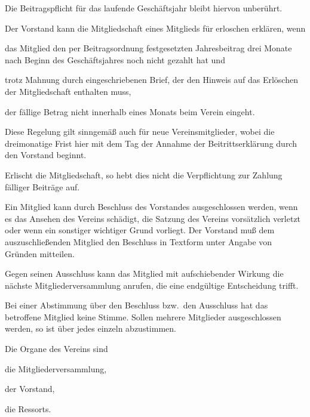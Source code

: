 \documentclass[draft]{scrartcl}
\begin{document}
\begin{contract}
Die Beitragspflicht für das laufende Geschäftsjahr bleibt hiervon unberührt.

Der Vorstand kann die Mitgliedschaft eines Mitglieds für erloschen erklären, wenn

\begin{compactitem}
  \item das Mitglied den per Beitragsordnung festgesetzten Jahresbeitrag
  drei Monate nach Beginn des Geschäftsjahres noch nicht gezahlt hat und
  \item trotz Mahnung durch eingeschriebenen Brief, der den Hinweis auf
  das Erlöschen der Mitgliedschaft enthalten muss,
  \item der fällige Betrag nicht innerhalb eines Monats beim Verein
  eingeht.
\end{compactitem}

Diese Regelung gilt sinngemäß auch für neue Vereinsmitglieder, wobei die
dreimonatige Frist hier mit dem Tag der Annahme der Beitrittserklärung
durch den Vorstand beginnt.

Erlischt die Mitgliedschaft, so hebt dies nicht die Verpflichtung zur Zahlung 
fälliger Beiträge auf.

\label{Ausschluss}

Ein Mitglied kann durch Beschluss des Vorstandes ausgeschlossen werden, wenn es
das Ansehen des Vereins schädigt, die Satzung des Vereins vorsätzlich
verletzt oder wenn ein sonstiger wichtiger Grund vorliegt. Der Vorstand muß
dem auszuschließenden Mitglied den Beschluss in Textform unter Angabe von Gründen
mitteilen.\label{Ausschluss}

Gegen seinen Ausschluss kann das Mitglied mit aufschiebender Wirkung die nächste
Mitgliederversammlung anrufen, die eine endgültige Entscheidung trifft.

Bei einer Abstimmung über den Beschluss bzw.\ den Ausschluss hat das betroffene
Mitglied keine Stimme. Sollen mehrere Mitglieder ausgeschlossen werden, so ist
über jedes einzeln abzustimmen.


Die Organe des Vereins sind

\begin{compactenum}[\hspace{2em}1.]
  \item die Mitgliederversammlung,
  \item der Vorstand,
  \item die Ressorts.
\end{compactenum}


\end{contract}
\end{document}
